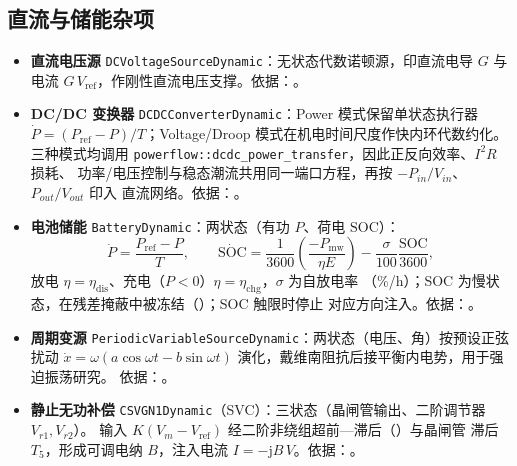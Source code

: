 \subsection{直流与储能杂项}
\label{sec:dynamics-dc-storage}
\begin{itemize}
  \item \textbf{直流电压源} \texttt{DCVoltageSourceDynamic}：无状态代数诺顿源，印直流电导 $G$ 与电流
        $G\,V_{\mathrm{ref}}$，作刚性直流电压支撑。依据：。
  \item \textbf{DC/DC 变换器} \texttt{DCDCConverterDynamic}：Power 模式保留单状态执行器
        $\dot P=(P_{\mathrm{ref}}-P)/T$；Voltage/Droop 模式在机电时间尺度作快内环代数约化。
        三种模式均调用 \texttt{powerflow::dcdc\_power\_transfer}，因此正反向效率、$I^2R$ 损耗、
        功率/电压控制与稳态潮流共用同一端口方程，再按 $-P_{in}/V_{in}$、$P_{out}/V_{out}$ 印入
        直流网络。依据：。
  \item \textbf{电池储能} \texttt{BatteryDynamic}：两状态（有功 $P$、荷电 $\mathrm{SOC}$）：
        \begin{equation}
         \dot P=\frac{P_{\mathrm{ref}}-P}{T},\qquad
         \dot{\mathrm{SOC}}=\frac{1}{3600}\!\left(\frac{-P_{\mathrm{mw}}}{\eta E}\right)
           -\frac{\sigma}{100}\frac{\mathrm{SOC}}{3600},
        \end{equation}
        放电 $\eta=\eta_{\mathrm{dis}}$、充电（$P<0$）$\eta=\eta_{\mathrm{chg}}$，$\sigma$ 为自放电率
        （\%/h）；SOC 为慢状态，在残差掩蔽中被冻结（）；SOC 触限时停止
        对应方向注入。依据：。
  \item \textbf{周期变源} \texttt{PeriodicVariableSourceDynamic}：两状态（电压、角）按预设正弦扰动
        $\dot x=\omega(a\cos\omega t-b\sin\omega t)$ 演化，戴维南阻抗后接平衡内电势，用于强迫振荡研究。
        依据：。
  \item \textbf{静止无功补偿} \texttt{CSVGN1Dynamic}（SVC）：三状态（晶闸管输出、二阶调节器 $V_{r1},V_{r2}$）。
        输入 $K(V_m-V_{\mathrm{ref}})$ 经二阶非绕组超前—滞后（）与晶闸管
        滞后 $T_5$，形成可调电纳 $B$，注入电流 $I=-\mathrm jB\,V$。依据：。
\end{itemize}


